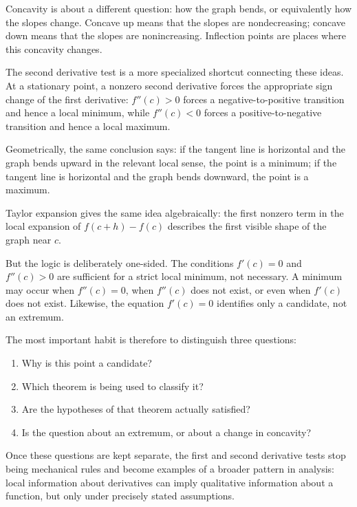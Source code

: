 \documentclass{essay}
\begin{document}
Concavity is about a different question: how the graph bends, or equivalently how the slopes change. Concave up means that the slopes are nondecreasing; concave down means that the slopes are nonincreasing. Inflection points are places where this concavity changes.

The second derivative test is a more specialized shortcut connecting these ideas. At a stationary point, a nonzero second derivative forces the appropriate sign change of the first derivative: \(f''(c)>0\) forces a negative-to-positive transition and hence a local minimum, while \(f''(c)<0\) forces a positive-to-negative transition and hence a local maximum.

Geometrically, the same conclusion says: if the tangent line is horizontal and the graph bends upward in the relevant local sense, the point is a minimum; if the tangent line is horizontal and the graph bends downward, the point is a maximum.

Taylor expansion gives the same idea algebraically: the first nonzero term in the local expansion of \(f(c+h)-f(c)\) describes the first visible shape of the graph near \(c\).

But the logic is deliberately one-sided. The conditions \(f'(c)=0\) and \(f''(c)>0\) are sufficient for a strict local minimum, not necessary. A minimum may occur when \(f''(c)=0\), when \(f''(c)\) does not exist, or even when \(f'(c)\) does not exist. Likewise, the equation \(f'(c)=0\) identifies only a candidate, not an extremum.

The most important habit is therefore to distinguish three questions:

\begin{enumerate}
    \item Why is this point a candidate?
    \item Which theorem is being used to classify it?
    \item Are the hypotheses of that theorem actually satisfied?
    \item Is the question about an extremum, or about a change in concavity?
\end{enumerate}

Once these questions are kept separate, the first and second derivative tests stop being mechanical rules and become examples of a broader pattern in analysis: local information about derivatives can imply qualitative information about a function, but only under precisely stated assumptions.
\end{document}
